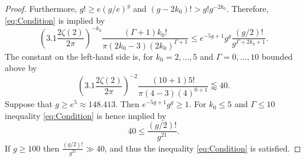 \documentclass[10pt,a4paper]{amsart}
\begin{document}
\begin{proof}
Furthermore, $g! \geq e(g/e)^g$ and $(g-2k_0)!>g! g^{-2k_0}$.
Therefore, \eqref{eq:Condition} is implied by 
\[
    \left(3.1\frac{2\zeta(2)}{2\pi}\right)^{-k_0}    
    \frac{(\Gamma+1)k_0!}{\pi(2k_0-3)(2k_0)^{\Gamma+1}}
    \leq e^{-5g+1} g^g
    \frac{(g/2)!}{g^{\Gamma+2k_0+1}}.
\]
The constant on the left-hand side is, for $k_0=2,\dots, 5$ and $\Gamma=0,\dots, 10$ bounded above by
\[
    \left(3.1\frac{2\zeta(2)}{2\pi}\right)^{-2}    
    \frac{(10+1)5!}{\pi(4-3)(4)^{0+1}}\lessapprox 40.
\]
Suppose that $g\geq e^5\approx 148.413$. Then $e^{-5g+1} g^g\geq 1$. For $k_0\leq 5$ and $\Gamma\leq 10$ 
inequality \eqref{eq:Condition} is hence implied by
\[
    40 
    \leq 
    \frac{(g/2)!}{g^{21}}.
\]
If $g\geq 100$ then $\frac{(g/2)!}{g^{21}}\gg 40$, and thus the inequality \eqref{eq:Condition} is satisfied. 
\end{proof}
\end{document}
